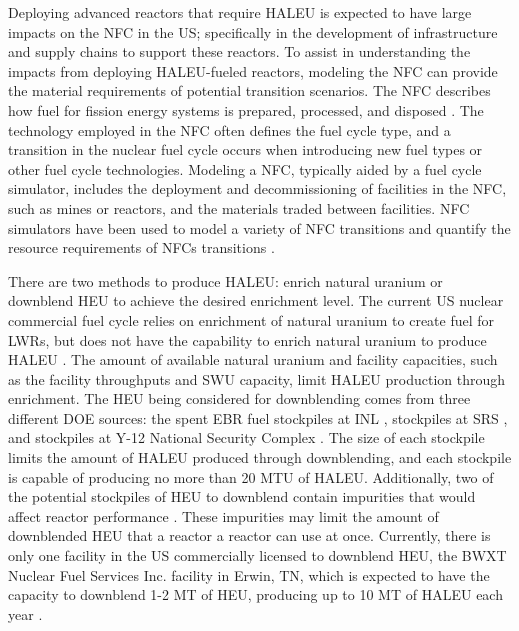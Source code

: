 Deploying advanced reactors that require \gls{HALEU} is expected to have 
large impacts on the \gls{NFC} in the US; specifically in the development 
of infrastructure and supply chains to support these reactors. To assist 
in understanding the impacts 
from deploying \gls{HALEU}-fueled reactors, modeling the \gls{NFC} 
can provide the material requirements of potential transition scenarios. 
The \gls{NFC} describes how fuel for fission energy systems is 
prepared, processed, and disposed \cite{tsoulfanidis_nuclear_2013}. 
The technology employed in the \gls{NFC} often defines the fuel 
cycle type, 
and a transition in the nuclear fuel cycle occurs when 
introducing new fuel types or other fuel cycle technologies.  
Modeling  a \gls{NFC}, typically aided by a fuel cycle simulator, 
includes the deployment and decommissioning of facilities in the \gls{NFC}, 
such as mines or reactors, and the materials traded between facilities. 
\gls{NFC} simulators have been used to model a variety of \gls{NFC} 
transitions \cite{sunny_transition_2015,bae_fuel_2018,piet_dynamic_2011} 
and quantify the resource requirements of \glspl{NFC} transitions
\cite{bachmann_enrichment_2021}. 

There are two methods to produce \gls{HALEU}: enrich natural uranium 
or downblend \acrfull{HEU} to achieve the desired enrichment level. The current US
nuclear commercial fuel cycle relies on enrichment of natural uranium 
to create fuel for \glspl{LWR}, but does not have the capability to enrich
natural uranium to produce \gls{HALEU} \cite{nuclear_energy_institute_addressing_2018}.  
The amount of available natural uranium and facility capacities, such 
as the facility throughputs and \gls{SWU} capacity, limit 
\gls{HALEU} production through enrichment. 
The \gls{HEU} being considered for downblending comes from three different 
\gls{DOE} sources: the spent \gls{EBR} fuel stockpiles at \gls{INL} 
\cite{patterson_haleu_2019}, stockpiles at \gls{SRS} \cite{regalbuto_addressing_2020}, 
and stockpiles at Y-12 National Security Complex 
\cite{robinson_establishment_2020}. The size of each stockpile limits the amount 
of \gls{HALEU} produced through downblending, and each stockpile is capable 
of producing no more than 20 MTU of \gls{HALEU}. Additionally, two 
of the potential stockpiles of \gls{HEU} to downblend  
contain impurities that would affect reactor performance 
\cite{vaden_isotopic_2018,nelson_foreign_2010}.
These impurities may limit the amount of downblended \gls{HEU} that a reactor 
a reactor can use at once. 
Currently, there is only one facility in the US commercially licensed to 
downblend \gls{HEU}, the BWXT Nuclear Fuel Services Inc. facility in 
Erwin, TN, which is expected to have the capacity to downblend 1-2 
MT of \gls{HEU}, producing up to 10 MT of \gls{HALEU} each year \cite{nagley_ha-leu_2020}.

